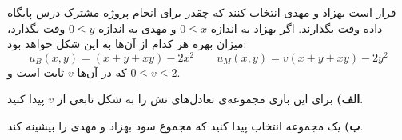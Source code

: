 قرار است بهزاد و مهدی انتخاب کنند که چقدر برای انجام پروژه مشترک درس پایگاه داده وقت بگذارند. اگر بهزاد به اندازه
 $0 \leq x$
 و مهدی به اندازه
 $0 \leq y$
 وقت بگذارد، میزان بهره هر کدام از آن‌ها به این شکل خواهد بود:
 \[
    u_B(x, y) = (x + y + xy) - 2x^2 \quad \quad u_M(x, y) = v(x + y + xy) - 2y^2   
 \]
 که در آن‌ها
 $v$
 ثابت است و
 $0 \leq v \leq 2$.
 \vspace{10pt}

 \textbf{الف)}
 برای این بازی مجموعه‌ی تعادل‌های نش را به شکل تابعی از 
 $v$
  پیدا کنید.
\vspace{5pt}

 \textbf{ب)}
 یک مجموعه انتخاب پیدا کنید که مجموع سود بهزاد و مهدی را بیشینه کند.